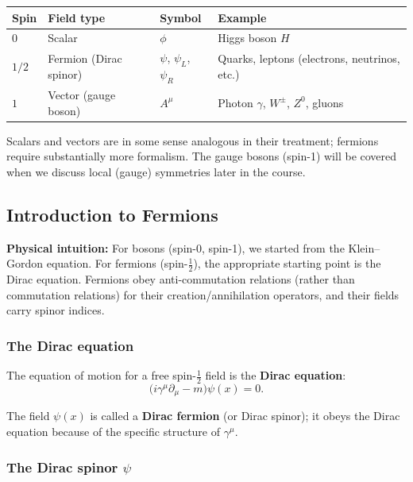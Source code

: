 \documentclass[../main.tex]{subfiles}
\begin{document}
\begin{center}
\renewcommand{\arraystretch}{1.4}
\begin{tabular}{llll}
  \toprule
  Spin & Field type & Symbol & Example \\
  \midrule
  $0$ & Scalar & $\phi$ & Higgs boson $H$\\
  $1/2$ & Fermion (Dirac spinor) & $\psi$, $\psi_L$, $\psi_R$ & Quarks, leptons (electrons, neutrinos, etc.)\\
  $1$ & Vector (gauge boson) & $A^\mu$ & Photon $\gamma$, $W^\pm$, $Z^0$, gluons\\
  \bottomrule
\end{tabular}
\end{center}

Scalars and vectors are in some sense analogous in their treatment; fermions require substantially more formalism.  The gauge bosons (spin-1) will be covered when we discuss local (gauge) symmetries later in the course.

\subsection*{Introduction to Fermions}

\noindent\textbf{Physical intuition:} For bosons (spin-0, spin-1), we started from the Klein--Gordon equation.  For fermions (spin-$\frac{1}{2}$), the appropriate starting point is the Dirac equation.  Fermions obey anti-commutation relations (rather than commutation relations) for their creation/annihilation operators, and their fields carry spinor indices.

\subsubsection*{The Dirac equation}

The equation of motion for a free spin-$\frac{1}{2}$ field is the \textbf{Dirac equation}:
\begin{equation}
  \boxed{\bigl(i\gamma^\mu\partial_\mu - m\bigr)\psi(x) = 0.}
  \label{eq:lec07:Dirac}
\end{equation}

The field $\psi(x)$ is called a \textbf{Dirac fermion} (or Dirac spinor); it obeys the Dirac equation because of the specific structure of $\gamma^\mu$.

\subsubsection*{The Dirac spinor $\psi$}
\end{document}
